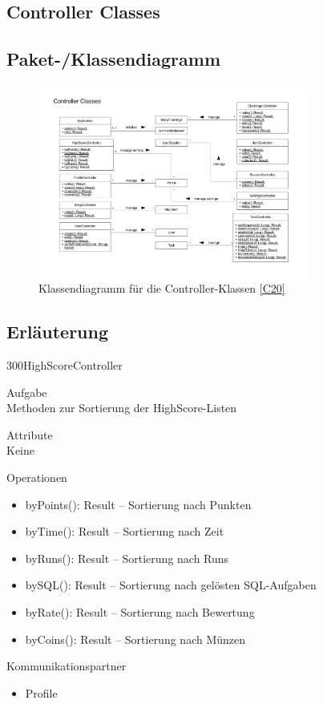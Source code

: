 \newpage
\subsection{Controller Classes}
\subsection{Paket-/Klassendiagramm}
\begin{figure}[h!]
\centering
\includegraphics[width=0.8\textwidth]{figures/KDController}
\caption{Klassendiagramm für die Controller-Klassen \ref{C20}}
\label{classC10}
\end{figure}
\clearpage
\subsection{Erläuterung}
\begin{class}{300}{HighScoreController}
\item[Aufgabe]~\\
Methoden zur Sortierung der HighScore-Listen
\item[Attribute]~\\
Keine
\item[Operationen]~\\
\begin{itemize}
\item byPoints(): Result -- Sortierung nach Punkten
\item byTime(): Result -- Sortierung nach Zeit
\item byRuns(): Result -- Sortierung nach Runs
\item bySQL(): Result -- Sortierung nach gelösten SQL-Aufgaben
\item byRate(): Result -- Sortierung nach Bewertung
\item byCoins(): Result -- Sortierung nach Münzen
\end{itemize}
\item[Kommunikationspartner]~\\
\begin{itemize}
\item Profile
\end{itemize}
\end{class}

